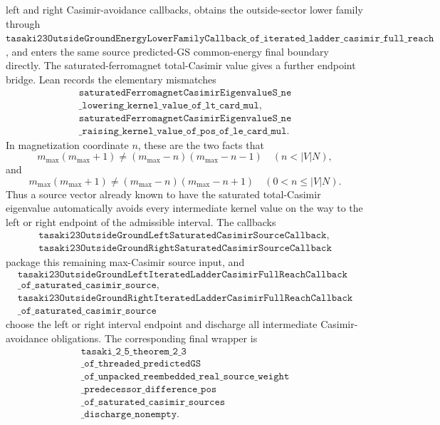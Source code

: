\documentclass[a4paper,11pt]{article}
\begin{document}
left and right Casimir-avoidance callbacks, obtains the outside-sector lower
family through
\(\texttt{tasaki23OutsideGroundEnergyLowerFamilyCallback\_of\_iterated\_ladder\_casimir\_full\_reach}\),
and enters the same source predicted-GS common-energy final boundary directly.
The saturated-ferromagnet total-Casimir value gives a further endpoint
bridge.  Lean records the elementary mismatches
\[
\begin{gathered}
\texttt{saturatedFerromagnetCasimirEigenvalueS\_ne}\\
\texttt{\_lowering\_kernel\_value\_of\_lt\_card\_mul},\\
\texttt{saturatedFerromagnetCasimirEigenvalueS\_ne}\\
\texttt{\_raising\_kernel\_value\_of\_pos\_of\_le\_card\_mul}.
\end{gathered}
\]
In magnetization coordinate \(n\), these are the two facts that
\[
  m_{\max}(m_{\max}+1)
  \ne (m_{\max}-n)(m_{\max}-n-1)
  \quad (n<|V|N),
\]
and
\[
  m_{\max}(m_{\max}+1)
  \ne (m_{\max}-n)(m_{\max}-n+1)
  \quad (0<n\le |V|N).
\]
Thus a source vector already known to have the saturated total-Casimir
eigenvalue automatically avoids every intermediate kernel value on the
way to the left or right endpoint of the admissible interval.  The
callbacks
\[
\begin{gathered}
\texttt{tasaki23OutsideGroundLeftSaturatedCasimirSourceCallback},\\
\texttt{tasaki23OutsideGroundRightSaturatedCasimirSourceCallback}
\end{gathered}
\]
package this remaining max-Casimir source input, and
\[
\begin{gathered}
\texttt{tasaki23OutsideGroundLeftIteratedLadderCasimirFullReachCallback}\\
\texttt{\_of\_saturated\_casimir\_source},\\
\texttt{tasaki23OutsideGroundRightIteratedLadderCasimirFullReachCallback}\\
\texttt{\_of\_saturated\_casimir\_source}
\end{gathered}
\]
choose the left or right interval endpoint and discharge all
intermediate Casimir-avoidance obligations.  The corresponding final
wrapper is
\[
\begin{gathered}
\texttt{tasaki\_2\_5\_theorem\_2\_3}\\
\texttt{\_of\_threaded\_predictedGS}\\
\texttt{\_of\_unpacked\_reembedded\_real\_source\_weight}\\
\texttt{\_predecessor\_difference\_pos}\\
\texttt{\_of\_saturated\_casimir\_sources}\\
\texttt{\_discharge\_nonempty}.
\end{gathered}
\]
\end{document}
